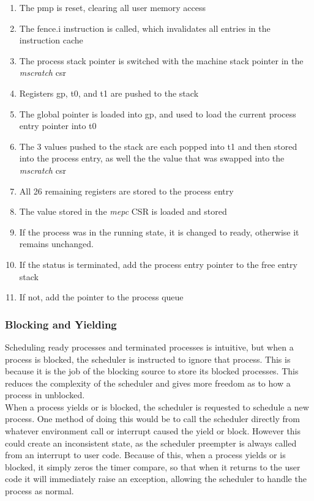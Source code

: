 \begin{enumerate}
    \item The \ac{pmp} is reset, clearing all user memory access
    \item The fence.i instruction is called, which invalidates all entries in the instruction cache
    \item The process stack pointer is switched with the machine stack pointer in the \textit{mscratch} csr
    \item Registers gp, t0, and t1 are pushed to the stack
    \item The global pointer is loaded into gp, and used to load the current process entry pointer into t0
    \item The 3 values pushed to the stack are each popped into t1 and then stored into the process entry, as well the the value that was swapped into the \textit{mscratch} csr
    \item All 26 remaining registers are stored to the process entry
    \item The value stored in the \textit{mepc} CSR is loaded and stored
    \item If the process was in the running state, it is changed to ready, otherwise it remains unchanged.
    \item If the status is terminated, add the process entry pointer to the free entry stack
    \item If not, add the pointer to the process queue
\end{enumerate}
\subsubsection{Blocking and Yielding}
Scheduling ready processes and terminated processes is intuitive, but when a process is blocked, the scheduler is instructed to ignore that process. This is because it is the job of the blocking source to store its blocked processes. This reduces the complexity of the scheduler and gives more freedom as to how a process in unblocked. \\
When a process yields or is blocked, the scheduler is requested to schedule a new process. One method of doing this would be to call the scheduler directly from whatever environment call or interrupt caused the yield or block. However this could create an inconsistent state, as the scheduler preempter is always called from an interrupt to user code. Because of this, when a process yields or is blocked, it simply zeros the timer compare, so that when it returns to the user code it will immediately raise an exception, allowing the scheduler to handle the process as normal.

